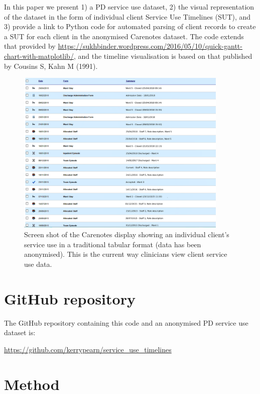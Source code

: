\documentclass{article}
\begin{document}
In this paper we present 1) a PD service use dataset, 2) the visual representation of the dataset in the form of individual client Service Use Timelines (SUT), and 3) provide a link to Python code for automated parsing of client records to create a SUT for each client in the anonymised Carenotes dataset. The code extends that provided by \url{https://sukhbinder.wordpress.com/2016/05/10/quick-gantt-chart-with-matplotlib/}, and the timeline visualisation is based on that published by Cousins S, Kahn M (1991)\cite{Cousins1991}. 

\begin{figure}[!h]
	\centering
	\includegraphics[width=0.9\textwidth]{images/Carenotes_screenshot_anonymous.png}
\caption{Screen shot of the Carenotes display showing an individual client’s service use in a traditional tabular format (data has been anonymised). This is the current way clinicians view client service use data.}
	\label{fig:carenotes}
\end{figure}

\section{GitHub repository}

The GitHub repository containing this code and an anonymised PD service use dataset is:

\url{https://github.com/kerrypearn/service_use_timelines}

\section{Method}
\end{document}
